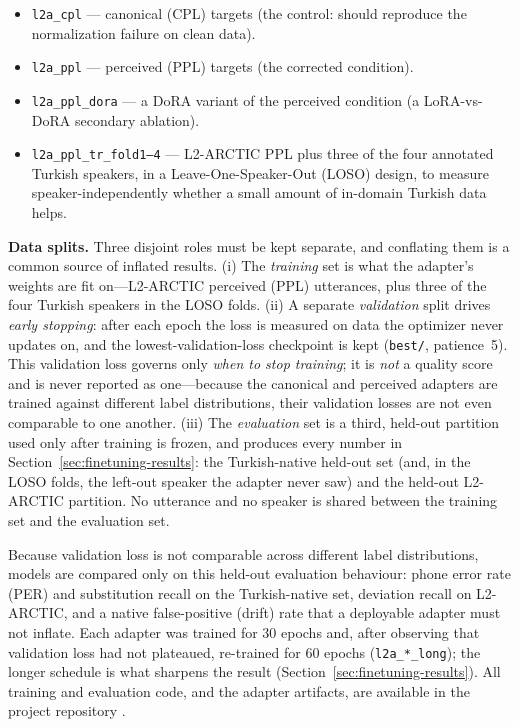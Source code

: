 \documentclass[a4paper,12pt]{report}
\begin{document}
\begin{itemize}
    \item \texttt{l2a\_cpl} --- canonical (CPL) targets (the control: should reproduce the normalization failure on clean data).
    \item \texttt{l2a\_ppl} --- perceived (PPL) targets (the corrected condition).
    \item \texttt{l2a\_ppl\_dora} --- a DoRA \cite{dora} variant of the perceived condition (a LoRA-vs-DoRA secondary ablation).
    \item \texttt{l2a\_ppl\_tr\_fold1--4} --- L2-ARCTIC PPL plus three of the four annotated Turkish speakers, in a Leave-One-Speaker-Out (LOSO) design, to measure speaker-independently whether a small amount of in-domain Turkish data helps.
\end{itemize}

\textbf{Data splits.} Three disjoint roles must be kept separate, and conflating them is a common source of inflated results. (i) The \emph{training} set is what the adapter's weights are fit on---L2-ARCTIC perceived (PPL) utterances, plus three of the four Turkish speakers in the LOSO folds. (ii) A separate \emph{validation} split drives \emph{early stopping}: after each epoch the loss is measured on data the optimizer never updates on, and the lowest-validation-loss checkpoint is kept (\texttt{best/}, patience~5). This validation loss governs only \emph{when to stop training}; it is \emph{not} a quality score and is never reported as one---because the canonical and perceived adapters are trained against different label distributions, their validation losses are not even comparable to one another. (iii) The \emph{evaluation} set is a third, held-out partition used only after training is frozen, and produces every number in Section~\ref{sec:finetuning-results}: the Turkish-native held-out set (and, in the LOSO folds, the left-out speaker the adapter never saw) and the held-out L2-ARCTIC partition. No utterance and no speaker is shared between the training set and the evaluation set.

Because validation loss is not comparable across different label distributions, models are compared only on this held-out evaluation behaviour: phone error rate (PER) and substitution recall on the Turkish-native set, deviation recall on L2-ARCTIC, and a native false-positive (drift) rate that a deployable adapter must not inflate. Each adapter was trained for 30 epochs and, after observing that validation loss had not plateaued, re-trained for 60 epochs (\texttt{l2a\_*\_long}); the longer schedule is what sharpens the result (Section~\ref{sec:finetuning-results}). All training and evaluation code, and the adapter artifacts, are available in the project repository \cite{github2024senior}.
\end{document}
